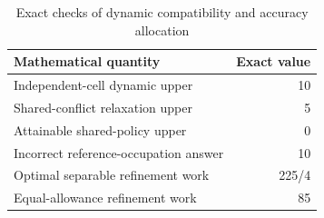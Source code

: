 \begin{table}[htbp]\centering
\caption{Exact checks of dynamic compatibility and accuracy allocation}\label{tab:fixtures86}
{\small\setlength{\tabcolsep}{4pt}\begin{tabular}{lr}\hline
Mathematical quantity & Exact value \\
\hline
Independent-cell dynamic upper & 10 \\
Shared-conflict relaxation upper & 5 \\
Attainable shared-policy upper & 0 \\
Incorrect reference-occupation answer & 10 \\
Optimal separable refinement work & 225/4 \\
Equal-allowance refinement work & 85 \\
\hline\end{tabular}}
\par{}\end{table}
